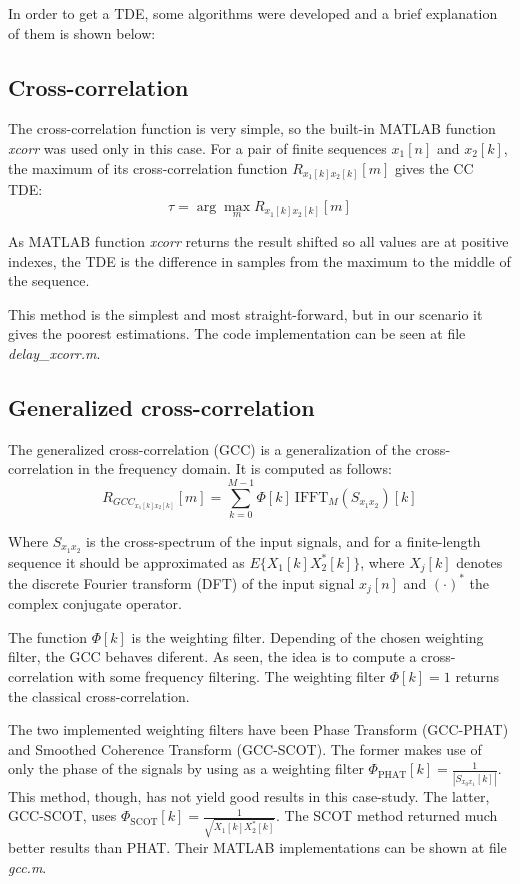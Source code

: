 In order to get a TDE, some algorithms were developed and a brief explanation of them is shown below:

\subsection{Cross-correlation}
  The cross-correlation function is very simple, so the built-in MATLAB function \emph{xcorr} was used only in this case. For a pair of finite sequences $x_1[n]$ and $x_2[k]$, the maximum of its cross-correlation function $R_{x_1[k] x_2[k]}[m]$ gives the CC TDE:
  $$ \tau = \arg\max_m R_{x_1[k] x_2[k]}[m] $$
  
  As MATLAB function \emph{xcorr} returns the result shifted so all values are at positive indexes, the TDE is the difference in samples from the maximum to the middle of the sequence.
  
  This method is the simplest and most straight-forward, but in our scenario it gives the poorest estimations. The code implementation can be seen at file \emph{delay\_xcorr.m}\cite{delayxcorr}.
  

\subsection{Generalized cross-correlation}
The generalized cross-correlation (GCC) is a generalization of the cross-correlation in the frequency domain. It is computed as follows:
$$R_{GCC_{x_1[k] x_2[k]}}[m] = \sum_{k=0}^{M-1} \Phi[k]\ \text{IFFT}_M(S_{x_1x_2})[k]$$

Where $S_{x_1x_2}$ is the cross-spectrum of the input signals, and for a finite-length sequence it should be approximated as $E\{X_1[k]X^*_2[k]\} $, where $X_j[k]$ denotes the discrete Fourier transform (DFT) of the input signal $x_j[n]$ and $(\cdotp)^*$ the complex conjugate operator.

The function $\Phi[k]$ is the weighting filter. Depending of the chosen weighting filter, the GCC behaves diferent. As seen, the idea is to compute a cross-correlation with some frequency filtering. The weighting filter $\Phi[k]=1$ returns the classical cross-correlation.

The two implemented weighting filters have been Phase Transform (GCC-PHAT) and Smoothed Coherence Transform (GCC-SCOT). The former makes use of only the phase of the signals by using as a weighting filter $\Phi_{\text{PHAT}}[k]=\frac{1}{|S_{x_0x_1}[k]|}$. This method, though, has not yield good results in this case-study. The latter, GCC-SCOT, uses $\Phi_{\text{SCOT}}[k]=\frac{1}{\sqrt{X_1[k]X^*_2[k]}}$. The SCOT method returned much better results than PHAT. Their MATLAB implementations can be shown at file \emph{gcc.m}\cite{gcc}.

